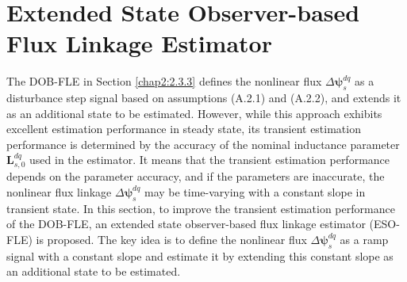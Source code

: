 \section{Extended State Observer-based Flux Linkage Estimator \cite{c3.1_1}}\label{chap3:3.1}
The DOB-FLE in Section \ref{chap2:2.3.3} defines the nonlinear flux \(\Delta\boldsymbol{\psi}^{dq}_s\) as a disturbance step signal based on assumptions (A.2.1) and (A.2.2), and extends it as an additional state to be estimated. However, while this approach exhibits excellent estimation performance in steady state, its transient estimation performance is determined by the accuracy of the nominal inductance parameter ${\mathbf{L}^{dq}_{s,0}}$ used in the estimator. It means that the transient estimation performance depends on the parameter accuracy, and if the parameters are inaccurate, the nonlinear flux linkage \(\Delta\boldsymbol{\psi}^{dq}_s\) may be time-varying with a constant slope in transient state. In this section, to improve the transient estimation performance of the DOB-FLE, an extended state observer-based flux linkage estimator (ESO-FLE) is proposed. The key idea is to define the nonlinear flux \(\Delta\boldsymbol{\psi}^{dq}_s\) as a ramp signal with a constant slope and estimate it by extending this constant slope as an additional state to be estimated. 

